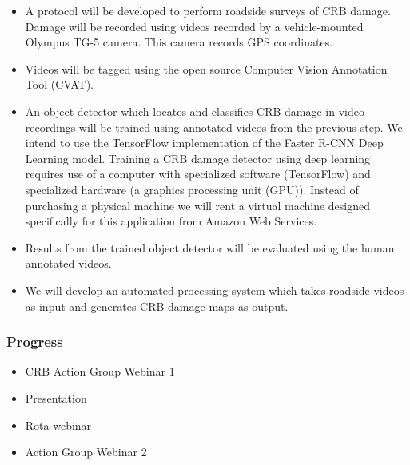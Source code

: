 \documentclass[12pt,letterpaper,english,bibliography=totocnumbered,abstract=on]{scrartcl}
\begin{document}
\begin{itemize}
	\item A protocol will be developed to perform roadside surveys of CRB damage. Damage will be recorded using videos recorded by a vehicle-mounted Olympus TG-5 camera. This camera records GPS coordinates.
	\item Videos will be tagged using the open source Computer Vision Annotation Tool (CVAT).
	\item An object detector which locates and classifies CRB damage in video recordings will be trained using annotated videos from the previous step. We intend to use the TensorFlow implementation of the Faster R-CNN Deep Learning model. Training a CRB damage detector using deep learning requires use of a computer with specialized software (TensorFlow) and specialized hardware (a graphics processing unit (GPU)). Instead of purchasing a physical machine we will rent a virtual machine designed specifically for this application from Amazon Web Services.
	\item Results from the trained object detector will be evaluated using the human annotated videos.
	\item We will develop an automated processing system which takes roadside videos as input and generates CRB damage maps as output.
\end{itemize}

\subsubsection{Progress}

\begin{itemize}
	\item CRB Action Group Webinar 1
	\item Presentation
	\item Rota webinar \cite{mooreCRBBiologyKnow2021}
	\item Action Group Webinar 2
\end{itemize}

\newpage
\end{document}
